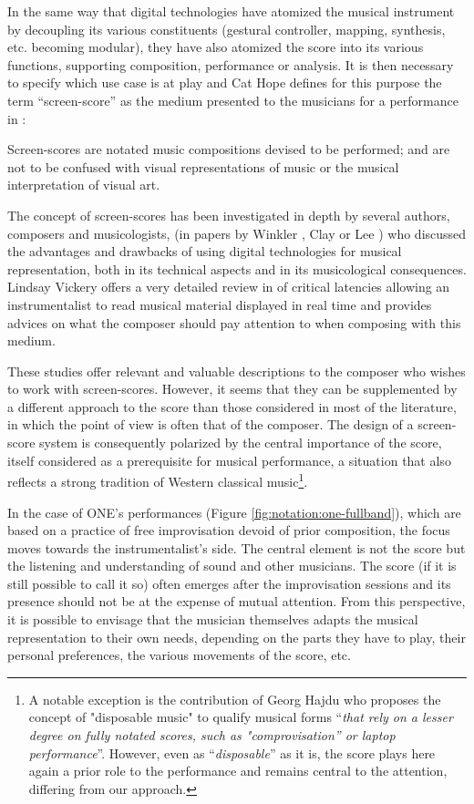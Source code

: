 In the same way that digital technologies have atomized the musical instrument by decoupling its various constituents (gestural controller, mapping, synthesis, etc. becoming modular), they have also atomized the score into its various functions, supporting composition, performance or analysis. It is then necessary to specify which use case is at play and Cat Hope defines for this purpose the term “screen-score” as the medium presented to the musicians for a performance in \cite{hope_screen_2011} :




Screen-scores are notated music compositions devised to be performed; and are not to be confused with visual representations of music or the musical interpretation of visual art.

The concept of screen-scores has been investigated in depth by several authors, composers and musicologists, (in papers by Winkler \cite{winkler_realtime-score._2004}, Clay \cite{adams_inventing_2008} or Lee \cite{lee_real-time_2012}) who discussed the advantages and drawbacks of using digital technologies for musical representation, both in its technical aspects and in its musicological consequences. Lindsay Vickery offers a very detailed review in \cite{vickery_limitations_2014} of critical latencies allowing an instrumentalist to read musical material displayed in real time and provides advices on what the composer should pay attention to when composing with this medium.

These studies offer relevant and valuable descriptions to the composer who wishes to work with screen-scores. However, it seems that they can be supplemented by a different approach to the score than those considered in most of the literature, in which the point of view is often that of the composer. The design of a screen-score system is consequently polarized by the central importance of the score, itself considered as a prerequisite for musical performance, a situation that also reflects a strong tradition of Western classical music\footnote{A notable exception is the contribution of Georg Hajdu \cite{hajdu_disposable_2016} who proposes the concept of "disposable music" to qualify musical forms “\textit{that rely on a lesser degree on fully notated scores, such as "comprovisation” or laptop performance}”. However, even as “\textit{disposable}” as it is, the score plays here again a prior role to the performance and remains central to the attention, differing from our approach.}.

In the case of ONE's performances (Figure \ref{fig:notation:one-fullband}), which are based on a practice of free improvisation devoid of prior composition, the focus moves towards the instrumentalist's side. The central element is not the score but the listening and understanding of sound and other musicians. The score (if it is still possible to call it so) often emerges after the improvisation sessions and its presence should not be at the expense of mutual attention. From this perspective, it is possible to envisage that the musician themselves adapts the musical representation to their own needs, depending on the parts they have to play, their personal preferences, the various movements of the score, etc.

